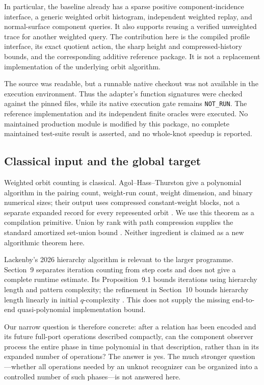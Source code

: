 In particular, the baseline already has a sparse positive component-incidence
interface, a generic weighted orbit histogram, independent weighted replay,
and normal-surface component queries. It also supports reusing a verified
unweighted trace for another weighted query. The contribution here is the
compiled profile interface, its exact quotient action, the sharp height and
compressed-history bounds, and the corresponding additive reference package.
It is not a replacement implementation of the underlying orbit algorithm.

The source was readable, but a runnable native checkout was not available in
the execution environment. Thus the adapter's function signatures were
checked against the pinned files, while its native execution gate remains
\texttt{NOT\_RUN}. The reference implementation and its independent finite
oracles were executed. No maintained production module is modified by this
package, no complete maintained test-suite result is asserted, and no
whole-knot speedup is reported.

\subsection{Classical input and the global target}

Weighted orbit counting is classical. Agol--Hass--Thurston give a polynomial
algorithm in the pairing count, weight-run count, weight dimension, and
binary numerical sizes; their output uses compressed constant-weight blocks,
not a separate expanded record for every represented orbit
\cite[Theorem~16]{aht}. We use this theorem as a compilation primitive.
Union by rank with path compression supplies the standard amortized
set-union bound \cite{tarjan}. Neither ingredient is claimed as a new
algorithmic theorem here.

Lackenby's 2026 hierarchy algorithm is relevant to the larger programme.
Section~9 separates iteration counting from step costs and does not give a
complete runtime estimate. Its Proposition~9.1 bounds iterations using
hierarchy length and pattern complexity; the refinement in Section~10
bounds hierarchy length linearly in initial $q$-complexity
\cite{lackenby}. This does not supply the missing end-to-end
quasi-polynomial implementation bound.

Our narrow question is therefore concrete: after a relation has been encoded
and its future full-port operations described compactly, can the component
observer process the entire phase in time polynomial in that description,
rather than in its expanded number of operations? The answer is yes. The
much stronger question---whether all operations needed by an unknot
recognizer can be organized into a controlled number of such phases---is
not answered here.

